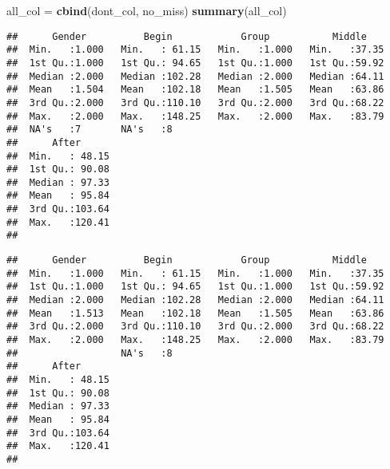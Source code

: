 \documentclass[
]{article}
\newenvironment{Shaded}{\begin{snugshade}}{\end{snugshade}}
\newcommand{\CommentTok}[1]{\textcolor[rgb]{0.56,0.35,0.01}{\textit{#1}}}
\newcommand{\DecValTok}[1]{\textcolor[rgb]{0.00,0.00,0.81}{#1}}
\newcommand{\KeywordTok}[1]{\textcolor[rgb]{0.13,0.29,0.53}{\textbf{#1}}}
\newcommand{\NormalTok}[1]{#1}
\newcommand{\OperatorTok}[1]{\textcolor[rgb]{0.81,0.36,0.00}{\textbf{#1}}}
\newcommand{\StringTok}[1]{\textcolor[rgb]{0.31,0.60,0.02}{#1}}
\begin{document}
\begin{Shaded}
\begin{Highlighting}[]
\NormalTok{all_col =}\StringTok{ }\KeywordTok{cbind}\NormalTok{(dont_col, no_miss)}
\KeywordTok{summary}\NormalTok{(all_col)}
\end{Highlighting}
\end{Shaded}

\begin{verbatim}
##      Gender          Begin            Group           Middle     
##  Min.   :1.000   Min.   : 61.15   Min.   :1.000   Min.   :37.35  
##  1st Qu.:1.000   1st Qu.: 94.65   1st Qu.:1.000   1st Qu.:59.92  
##  Median :2.000   Median :102.28   Median :2.000   Median :64.11  
##  Mean   :1.504   Mean   :102.18   Mean   :1.505   Mean   :63.86  
##  3rd Qu.:2.000   3rd Qu.:110.10   3rd Qu.:2.000   3rd Qu.:68.22  
##  Max.   :2.000   Max.   :148.25   Max.   :2.000   Max.   :83.79  
##  NA's   :7       NA's   :8                                       
##      After       
##  Min.   : 48.15  
##  1st Qu.: 90.08  
##  Median : 97.33  
##  Mean   : 95.84  
##  3rd Qu.:103.64  
##  Max.   :120.41  
## 
\end{verbatim}

\begin{Shaded}
\end{Shaded}

\begin{verbatim}
##      Gender          Begin            Group           Middle     
##  Min.   :1.000   Min.   : 61.15   Min.   :1.000   Min.   :37.35  
##  1st Qu.:1.000   1st Qu.: 94.65   1st Qu.:1.000   1st Qu.:59.92  
##  Median :2.000   Median :102.28   Median :2.000   Median :64.11  
##  Mean   :1.513   Mean   :102.18   Mean   :1.505   Mean   :63.86  
##  3rd Qu.:2.000   3rd Qu.:110.10   3rd Qu.:2.000   3rd Qu.:68.22  
##  Max.   :2.000   Max.   :148.25   Max.   :2.000   Max.   :83.79  
##                  NA's   :8                                       
##      After       
##  Min.   : 48.15  
##  1st Qu.: 90.08  
##  Median : 97.33  
##  Mean   : 95.84  
##  3rd Qu.:103.64  
##  Max.   :120.41  
## 
\end{verbatim}
\end{document}
